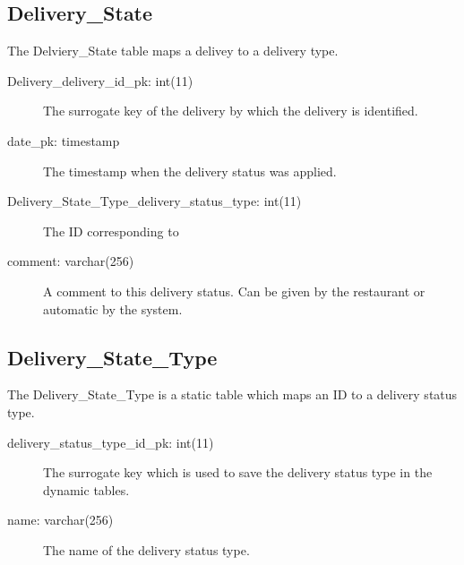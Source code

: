     \subsection{Delivery\_State}
    The Delviery\_State table maps a delivey to a delivery type.
    \begin{description}
        \item[Delivery\_delivery\_id\_pk: int(11)] The surrogate key of the delivery by which the delivery is identified.
        \item[date\_pk: timestamp] The timestamp when the delivery status was applied.
        \item[Delivery\_State\_Type\_delivery\_status\_type: int(11)] The ID corresponding to 
        \item[comment: varchar(256)] A comment to this delivery status. Can be given by the restaurant or automatic by the system.
    \end{description}

    \subsection{Delivery\_State\_Type}
    The Delivery\_State\_Type is a static table which maps an ID to a delivery status type.
    \begin{description}
        \item[delivery\_status\_type\_id\_pk: int(11)] The surrogate key which is used to save the delivery status type in the dynamic tables.
        \item[name: varchar(256)] The name of the delivery status type.
    \end{description}

